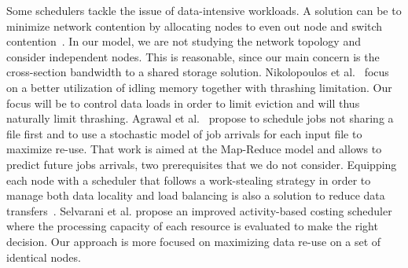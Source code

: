 \documentclass[sigconf,review,anonymous]{acmart}
\begin{document}
Some schedulers tackle the issue of data-intensive workloads. 
A solution can be to minimize network contention by allocating nodes to even out node and
switch contention~\cite{minimize_network_contention}. 
In our model, we are not studying the network topology and consider independent nodes.
This is reasonable, since our main concern is the cross-section bandwidth to a shared storage solution.
%
Nikolopoulos et al.~\cite{Nikolopoulos2003AdaptiveSU}
focus on a better utilization of idling memory together with 
thrashing limitation.
Our focus will be to control data loads in order to limit eviction
and will thus naturally limit thrashing. 
%
Agrawal et al.~\cite{Scheduling_Shared_Scans_of_Large_Data_Files}
propose to schedule jobs not sharing a file first
and to use a stochastic model of job arrivals for each input file to maximize re-use.
That work is aimed at the Map-Reduce model and allows to predict future jobs arrivals, two prerequisites that we do not consider. 
%
Equipping each node with a scheduler that follows a work-stealing
strategy in order to manage both data locality 
and load balancing is also a solution to reduce data transfers~\cite{Optimizing_load_balancing_and_data_locality_with_data_aware_scheduling}. 
%
Selvarani et al. propose an improved activity-based costing scheduler~\cite{Improved_cost_based_algorithm}
where the processing capacity of each resource is evaluated to make the right decision.
Our approach is more focused on maximizing data re-use on a 
set of identical nodes.

\end{document}
